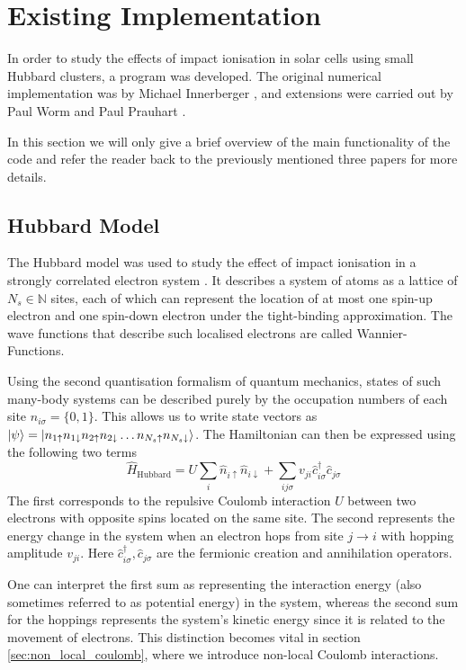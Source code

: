 \section{Existing Implementation}
In order to study the effects of impact ionisation in solar cells using small Hubbard clusters, a program was developed. The original numerical implementation was by Michael Innerberger \cite{innerberger}, and extensions were carried out by Paul Worm \cite{worm_bachelor, worm_project} and Paul Prauhart \cite{prauhart}.
\medskip

In this section we will only give a brief overview of the main functionality of the code and refer the reader back to the previously mentioned three papers for more details.

\subsection{Hubbard Model} \label{sec:hubbard_model}
The Hubbard model was used to study the effect of impact ionisation in a strongly correlated electron system . It describes a system of atoms as a lattice of $N_s\in \mathbb{N}$ sites, each of which can represent the location of at most one spin-up electron and one spin-down electron under the tight-binding approximation. The wave functions that describe such localised electrons are called Wannier-Functions.
\medskip

Using the second quantisation formalism of quantum mechanics, states of such many-body systems can be described purely by the occupation numbers of each site $n_{i\sigma} = \{0,1\}$. This allows us to write state vectors as $\ket{\psi}= \ket{n_{1\uparrow}n_{1\downarrow} n_{2\uparrow}n_{2\downarrow}\dots n_{N_{s}\uparrow}n_{N_{s}\downarrow}}$. The Hamiltonian can then be expressed using the following two terms
\begin{equation}
    \hat{H}_{\text{Hubbard}} = U \sum_i \hat{n}_{i\uparrow} \hat{n}_{i\downarrow} + \sum_{ij\sigma} v_{ji} \hat{c}^\dagger_{i\sigma} \hat{c}_{j\sigma}\label{eq:hubbard_hamiltonian}
\end{equation}
The first corresponds to the repulsive Coulomb interaction $U$ between two electrons with opposite spins located on the same site. The second represents the energy change in the system when an electron hops from site $j\to i$ with hopping amplitude $v_{ji}$. Here $\hat{c}_{i\sigma}^\dagger, \hat{c}_{j\sigma}$ are the fermionic creation and annihilation operators.
\medskip

One can interpret the first sum as representing the interaction energy (also sometimes referred to as potential energy) in the system, whereas the second sum for the hoppings represents the system's kinetic energy since it is related to the movement of electrons. This distinction becomes vital in section \ref{sec:non_local_coulomb}, where we introduce non-local Coulomb interactions.



